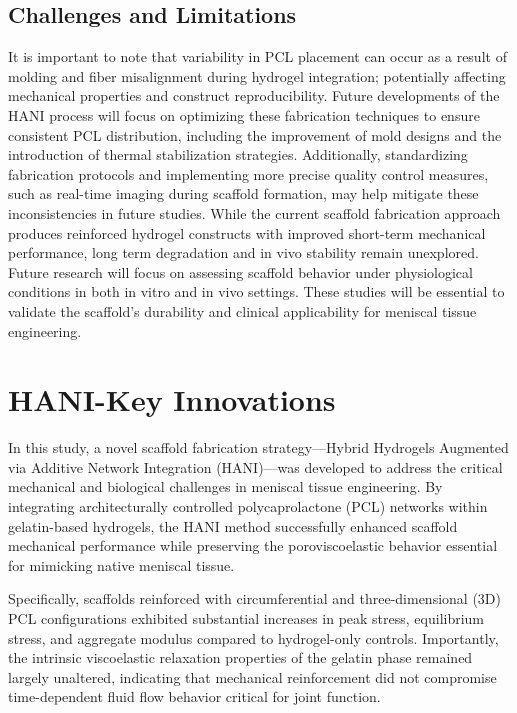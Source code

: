 \subsection{Challenges and Limitations}

It is important to note that variability in PCL placement can occur as a result of molding and fiber misalignment during hydrogel integration; potentially affecting mechanical properties and construct reproducibility. Future developments of the HANI process will focus on optimizing these fabrication techniques to ensure consistent PCL distribution, including the improvement of mold designs and the introduction of thermal stabilization strategies. Additionally, standardizing fabrication protocols and implementing more precise quality control measures, such as real-time imaging during scaffold formation, may help mitigate these inconsistencies in future studies. While the current scaffold fabrication approach produces reinforced hydrogel constructs with improved short-term mechanical performance, long term degradation and in vivo stability remain unexplored. Future research will focus on assessing scaffold behavior under physiological conditions in both in vitro and in vivo settings. These studies will be essential to validate the scaffold's durability and clinical applicability for meniscal tissue engineering.

\section{HANI-Key Innovations}

In this study, a novel scaffold fabrication strategy---Hybrid Hydrogels Augmented via Additive Network Integration (HANI)---was developed to address the critical mechanical and biological challenges in meniscal tissue engineering. By integrating architecturally controlled polycaprolactone (PCL) networks within gelatin-based hydrogels, the HANI method successfully enhanced scaffold mechanical performance while preserving the poroviscoelastic behavior essential for mimicking native meniscal tissue.

Specifically, scaffolds reinforced with circumferential and three-dimensional (3D) PCL configurations exhibited substantial increases in peak stress, equilibrium stress, and aggregate modulus compared to hydrogel-only controls. Importantly, the intrinsic viscoelastic relaxation properties of the gelatin phase remained largely unaltered, indicating that mechanical reinforcement did not compromise time-dependent fluid flow behavior critical for joint function.

